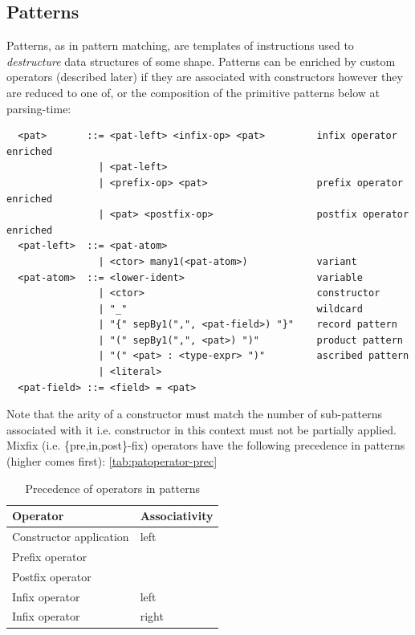 \documentclass[a4paper, 11pt]{article}
\theoremstyle{remark}\newtheorem*{remark}{Remark}
\theoremstyle{definition}\newtheorem*{definition}{Definition}
\begin{document}
\subsection{Patterns}
Patterns, as in pattern matching, are templates of instructions used to
\emph{destructure} data structures of some shape. Patterns can be enriched by
custom operators (described later) if they are associated with constructors however they are
reduced to one of, or the composition of the primitive patterns below at parsing-time:
\begin{verbatim}
  <pat>       ::= <pat-left> <infix-op> <pat>         infix operator enriched
                | <pat-left>
                | <prefix-op> <pat>                   prefix operator enriched
                | <pat> <postfix-op>                  postfix operator enriched
  <pat-left>  ::= <pat-atom>
                | <ctor> many1(<pat-atom>)            variant
  <pat-atom>  ::= <lower-ident>                       variable
                | <ctor>                              constructor
                | "_"                                 wildcard
                | "{" sepBy1(",", <pat-field>) "}"    record pattern
                | "(" sepBy1(",", <pat>) ")"          product pattern
                | "(" <pat> : <type-expr> ")"         ascribed pattern
                | <literal>
  <pat-field> ::= <field> = <pat>
\end{verbatim}
Note that the arity of a constructor must match the number of sub-patterns associated with it i.e.
constructor in this context must not be partially applied. Mixfix (i.e. \{pre,in,post\}-fix) operators have the following precedence in patterns (higher comes first): \autoref{tab:patoperator-prec}
\begin{table}[]
  \centering
  \begin{tabular}{@{}ll@{}}
    \toprule
    Operator                & Associativity \\ \midrule
    Constructor application & left          \\
    Prefix operator         &               \\
    Postfix operator        &               \\
    Infix operator          & left          \\
    Infix operator          & right         \\ \bottomrule
  \end{tabular}
  \caption{Precedence of operators in patterns}\label{tab:patoperator-prec}
\end{table}
\end{document}
